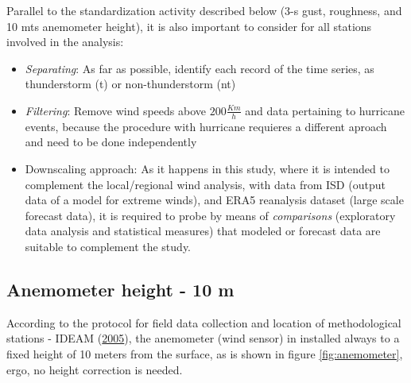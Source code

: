 \documentclass[12pt,oneside]{reedthesis}
\begin{document}
Parallel to the standardization activity described below (3-s gust, roughness, and 10 mts anemometer height), it is also important to consider for all stations involved in the analysis:
\begin{itemize}
\item
  \emph{Separating}: As far as possible, identify each record of the time series, as thunderstorm (t) or non-thunderstorm (nt)
\item
  \emph{Filtering}: Remove wind speeds above \(200 \frac{Km}{h}\) and data pertaining to hurricane events, because the procedure with hurricane requieres a different aproach and need to be done independently
\item
  Downscaling approach: As it happens in this study, where it is intended to complement the local/regional wind analysis, with data from ISD (output data of a model for extreme winds), and ERA5 reanalysis dataset (large scale forecast data), it is required to probe by means of \emph{comparisons} (exploratory data analysis and statistical measures) that modeled or forecast data are suitable to complement the study.
\end{itemize}
\hypertarget{anemometer-height---10-m}{%
\subsection{Anemometer height - 10 m}\label{anemometer-height---10-m}}

According to the protocol for field data collection and location of methodological stations - IDEAM (\protect\hyperlink{ref-ideam2005}{2005}), the anemometer (wind sensor) in installed always to a fixed height of 10 meters from the surface, as is shown in figure \ref{fig:anemometer}, ergo, no height correction is needed.
\end{document}
